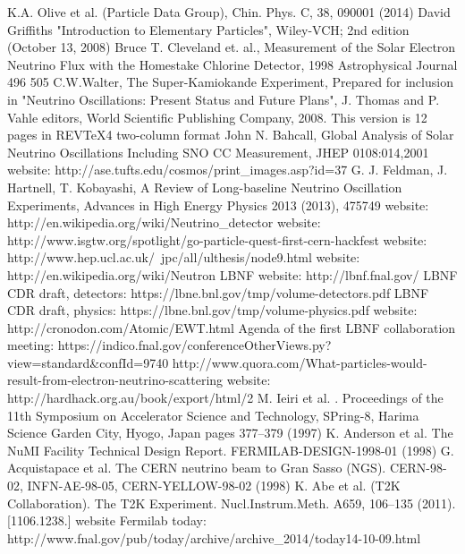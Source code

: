 \begin{thebibliography}{1}
    K.A. Olive et al. (Particle Data Group), Chin. Phys. C, 38, 090001 (2014) 
    David Griffiths "Introduction to Elementary Particles", Wiley-VCH; 2nd edition (October 13, 2008)
    Bruce T. Cleveland et. al., Measurement of the Solar Electron Neutrino Flux with the Homestake Chlorine Detector, 1998 Astrophysical Journal 496 505
    C.W.Walter, The Super-Kamiokande Experiment, Prepared for inclusion in "Neutrino Oscillations: Present Status and Future Plans", J. Thomas and P. Vahle editors, World Scientific Publishing Company, 2008. This version is 12 pages in REVTeX4 two-column format
    John N. Bahcall, Global Analysis of Solar Neutrino Oscillations Including SNO CC Measurement, JHEP 0108:014,2001
    website: http://ase.tufts.edu/cosmos/print\_images.asp?id=37
    G. J. Feldman, J. Hartnell, T. Kobayashi, A Review of Long-baseline Neutrino Oscillation Experiments, Advances in High Energy Physics 2013 (2013), 475749
    website: http://en.wikipedia.org/wiki/Neutrino\_detector
    website: http://www.isgtw.org/spotlight/go-particle-quest-first-cern-hackfest
    website: http://www.hep.ucl.ac.uk/~jpc/all/ulthesis/node9.html
    website: http://en.wikipedia.org/wiki/Neutron
    LBNF website: http://lbnf.fnal.gov/
    LBNF CDR draft, detectors: https://lbne.bnl.gov/tmp/volume-detectors.pdf
    LBNF CDR draft, physics: https://lbne.bnl.gov/tmp/volume-physics.pdf
    website: http://cronodon.com/Atomic/EWT.html
    Agenda of the first LBNF collaboration meeting: https://indico.fnal.gov/conferenceOtherViews.py? view=standard\&confId=9740
   http://www.quora.com/What-particles-would-result-from-electron-neutrino-scattering
    website: http://hardhack.org.au/book/export/html/2
    M. Ieiri et al. . Proceedings of the 11th Symposium on Accelerator Science and Technology, SPring-8,
Harima Science Garden City, Hyogo, Japan pages 377–379 (1997)
    K. Anderson et al. The NuMI Facility Technical Design Report. FERMILAB-DESIGN-1998-01 (1998)
    G. Acquistapace et al. The CERN neutrino beam to Gran Sasso (NGS). CERN-98-02, INFN-AE-98-05,
CERN-YELLOW-98-02 (1998)
    K. Abe et al. (T2K Collaboration). The T2K Experiment. Nucl.Instrum.Meth. A659, 106–135 (2011).
[1106.1238.]
    website Fermilab today: http://www.fnal.gov/pub/today/archive/archive\_2014/today14-10-09.html
\end{thebibliography}
